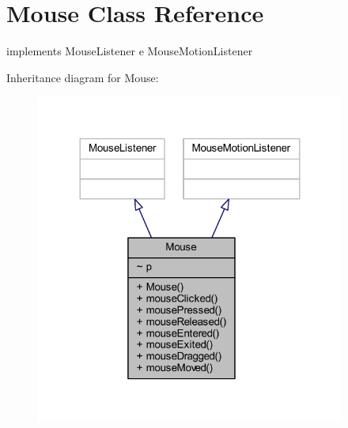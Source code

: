 \hypertarget{classa_1_1survival_1_1game_1_1_mouse}{}\section{Mouse Class Reference}
\label{classa_1_1survival_1_1game_1_1_mouse}


implements Mouse\+Listener e Mouse\+Motion\+Listener  




Inheritance diagram for Mouse\+:
\nopagebreak
\begin{figure}[H]
\begin{center}
\leavevmode
\includegraphics[width=288pt]{classa_1_1survival_1_1game_1_1_mouse__inherit__graph}
\end{center}
\end{figure}


